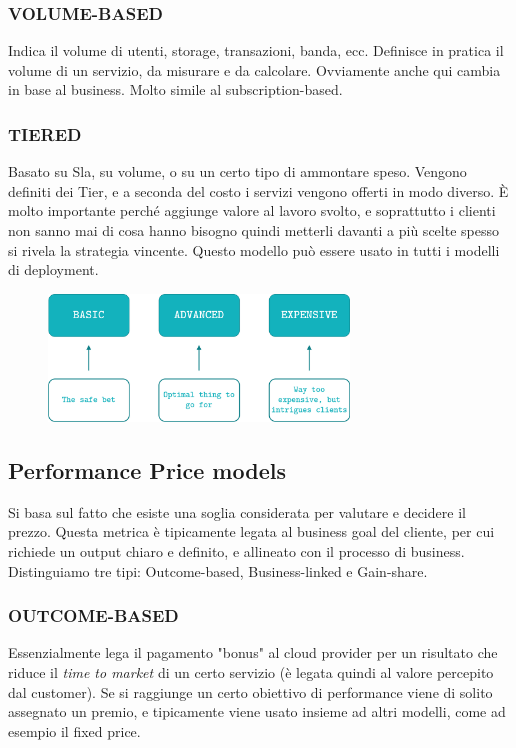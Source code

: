 \subsubsection{VOLUME-BASED}
Indica il volume di utenti, storage, transazioni, banda, ecc. Definisce in pratica il volume di un servizio, da misurare e da calcolare. Ovviamente anche qui cambia in base al business. Molto simile al subscription-based.

\subsubsection{TIERED}
Basato su Sla, su volume, o su un certo tipo di ammontare speso. Vengono definiti dei Tier, e a seconda del costo i servizi vengono offerti in modo diverso. È molto importante perché aggiunge valore al lavoro svolto, e soprattutto i clienti non sanno mai di cosa hanno bisogno quindi metterli davanti a più scelte spesso si rivela la strategia vincente. Questo modello può essere usato in tutti i modelli di deployment.

\begin{figure}[ht]
    \centering
    \includegraphics[width=8cm]{./Images/cap6/6.2.png}
\end{figure}

\subsection{Performance Price models}
Si basa sul fatto che esiste una soglia considerata per valutare e decidere il prezzo. Questa metrica è tipicamente legata al business goal del cliente, per cui richiede un output chiaro e definito, e allineato con il processo di business. Distinguiamo tre tipi: Outcome-based, Business-linked e Gain-share.

\subsubsection{OUTCOME-BASED}
Essenzialmente lega il pagamento "bonus" al cloud provider per un risultato che riduce il \textit{time to market} di un certo servizio (è legata quindi al valore percepito dal customer). Se si raggiunge un certo obiettivo di performance viene di solito assegnato un premio, e tipicamente viene usato insieme ad altri modelli, come ad esempio il fixed price.

